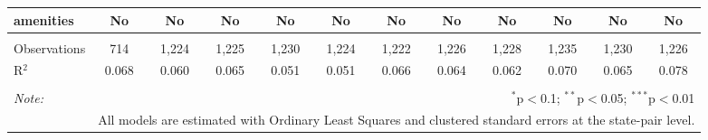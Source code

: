 \begin{table}[!htbp]
\begin{tabular}{@{\extracolsep{5pt}}lccccccccccc}
amenities & No & No & No & No & No & No & No & No & No & No & No \\ 
\hline \\[-1.8ex] 
Observations & 714 & 1,224 & 1,225 & 1,230 & 1,224 & 1,222 & 1,226 & 1,228 & 1,235 & 1,230 & 1,226 \\ 
R$^{2}$ & 0.068 & 0.060 & 0.065 & 0.051 & 0.051 & 0.066 & 0.064 & 0.062 & 0.070 & 0.065 & 0.078 \\ 
\hline 
\hline \\[-1.8ex] 
\textit{Note:}  & \multicolumn{11}{r}{$^{*}$p$<$0.1; $^{**}$p$<$0.05; $^{***}$p$<$0.01} \\ 
 & \multicolumn{11}{r}{All models are estimated with Ordinary Least Squares and clustered standard errors at the state-pair level.} \\ 
\end{tabular} 
\end{table} 
